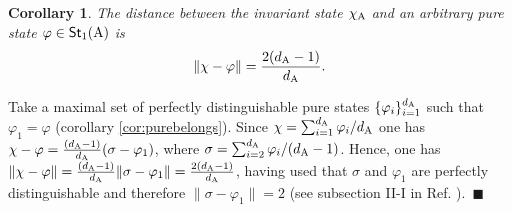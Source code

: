 \documentclass[12pt,aps,pra,showpacs,groupedaddress]{revtex4-1}
\newtheorem{corollary}{Corollary} \newtheorem{theorem}{Theorem}
\def\Proof{\medskip\par\noindent{\bf Proof. }}
\def\qed{$\,\blacksquare$\par}
\def\Stset{{\mathsf{St}}}
\begin{document}
\begin{corollary}
  The distance between the invariant state $\chi_{\rm A}$ and an arbitrary
  pure state $\varphi \in \Stset_1 (\rA)$ is
\begin{equation*}
\|  \chi- \varphi \|  = \frac{2(d_\rA -1)}{d_\rA}.  
\end{equation*}
\end{corollary}
\Proof Take a maximal set of perfectly distinguishable pure states
$\{\varphi_i\}_{i=1}^{d_{\rm A}}$ such that $\varphi_1 = \varphi$
(corollary \ref{cor:purebelongs}). Since $\chi= \sum_{i=1}^{d_{\rm A}}
\varphi_i/d_{\rm A}$ one has $\chi-\varphi = \frac{(d_{\rm A}-1)}{d_{\rm A}}
(\sigma-\varphi_1)$, where $\sigma= \sum_{i=2}^{d_{\rm A}}
\varphi_i/(d_{\rm A}-1)$. Hence, one has $\|\chi -\varphi \| =
\frac{(d_{\rm A}-1)}{d_{\rm A}} \| \sigma-\varphi_1\| =
\frac{2(d_{\rm A}-1)}{d_{\rm A}}$, having used that $\sigma$ and $\varphi_1$
are perfectly distinguishable and therefore $\| \sigma - \varphi_1 \|
= 2$ (see subsection II-I in Ref. \cite{purification}). \qed
\end{document}
